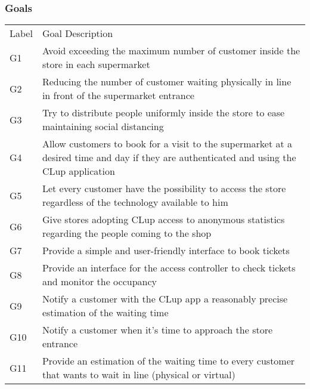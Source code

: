 \vfill

\pagebreak

\subsubsection{Goals}
\renewcommand{\arraystretch}{1.4}
\begin{tabular}{C{1cm}L{14.1cm}}
      Label & Goal Description                                                                                                                          \\
      G1    & Avoid exceeding the maximum number of customer inside the store in each supermarket                                                       \\
      G2    & Reducing the number of customer waiting physically in line in front of the supermarket entrance                                           \\
      G3    & Try to distribute people uniformly inside the store to ease maintaining social distancing                                                 \\
      G4    & Allow customers to book for a visit to the supermarket at a desired time and day if they are authenticated and using the CLup application \\
      G5    & Let every customer have the possibility to access the store regardless of the technology available to him                                 \\
      G6    & Give stores adopting CLup access to anonymous statistics regarding the people coming to the shop                                          \\
      G7    & Provide a simple and user-friendly interface to book tickets                                                                              \\
      G8    & Provide an interface for the access controller to check tickets and monitor the occupancy                                                 \\
      G9    & Notify a customer with the CLup app a reasonably precise estimation of the waiting time                                                   \\
      G10   & Notify a customer when it's time to approach the store entrance                                                                           \\
      G11   & Provide an estimation of the waiting time to every customer that wants to wait in line (physical or virtual)                              \\
\end{tabular}

